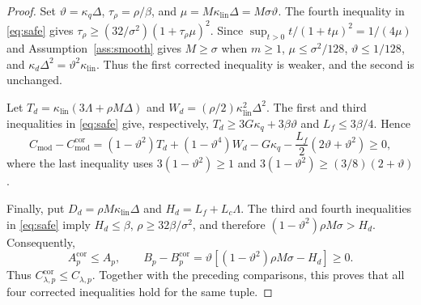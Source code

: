 \documentclass[11pt]{article}
\theoremstyle{definition}
\theoremstyle{remark}
\numberwithin{equation}{section}
\numberwithin{figure}{section}
\numberwithin{table}{section}
\numberwithin{algorithm}{section}
\begin{document}
\begin{proof}
Set \(\vartheta=\kappa_q\Delta\), \(\tau_\rho=\rho/\beta\), and
\(\mu=M\kappa_{\mathrm{lin}}\Delta=M\sigma\vartheta\).  The fourth inequality
in \eqref{eq:safe} gives
\(\tau_\rho\ge(32/\sigma^2)(1+\tau_\rho\mu)^2\).
Since \(\sup_{t>0}t/(1+t\mu)^2=1/(4\mu)\) and Assumption~\ref{ass:smooth}
gives \(M\ge\sigma\) when \(m\ge1\),
\(\mu\le\sigma^2/128\), \(\vartheta\le1/128\), and
\(\kappa_d\Delta^2=\vartheta^2\kappa_{\mathrm{lin}}\).  Thus the first corrected inequality is weaker, and the second is unchanged.

Let \(T_d=\kappa_{\mathrm{lin}}(3\Lambda+\rho M\Delta)\) and
\(W_d=(\rho/2)\kappa_{\mathrm{lin}}^2\Delta^2\).  The first and third inequalities in \eqref{eq:safe} give, respectively,
\(T_d\ge3G\kappa_q+3\beta\vartheta\) and \(L_f\le3\beta/4\).  Hence
\begin{equation*}
 C_{\mathrm{mod}}-C_{\mathrm{mod}}^{\mathrm{cor}}
 =(1-\vartheta^2)T_d+(1-\vartheta^4)W_d-G\kappa_q
   -\frac{L_f}{2}(2\vartheta+\vartheta^2)
 \ge0,
\end{equation*}
where the last inequality uses \(3(1-\vartheta^2)\ge1\) and
\(3(1-\vartheta^2)\ge(3/8)(2+\vartheta)\).

Finally, put \(D_d=\rho M\kappa_{\mathrm{lin}}\Delta\) and
\(H_d=L_f+L_c\Lambda\).  The third and fourth inequalities in
\eqref{eq:safe} imply
\(H_d\le\beta\), \(\rho\ge32\beta/\sigma^2\), and therefore
\((1-\vartheta^2)\rho M\sigma>H_d\).  Consequently,
$$
 A_p^{\mathrm{cor}}\le A_p,\qquad
 B_p-B_p^{\mathrm{cor}}
 =\vartheta[(1-\vartheta^2)\rho M\sigma-H_d]\ge0.
$$
Thus \(C_{\lambda,p}^{\mathrm{cor}}\le
C_{\lambda,p}\).  Together with the preceding comparisons, this proves that all four corrected inequalities hold for the same tuple.


\end{proof}
\end{document}
